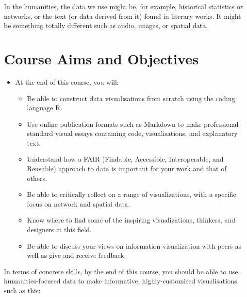 \documentclass[
  letterpaper,
  DIV=11,
  numbers=noendperiod]{scrreprt}
\begin{document}
In the humanities, the data we use might be, for example, historical
statistics or networks, or the text (or data derived from it) found in
literary works. It might be something totally different such as audio,
images, or spatial data.

\section*{Course Aims and Objectives}\label{course-aims-and-objectives}


\begin{itemize}
\item
  At the end of this course, you will:

  \begin{itemize}
  \item
    Be able to construct data visualisations from scratch using the
    coding language R.
  \item
    Use online publication formats such as Markdown to make
    professional-standard visual essays containing code, visualisations,
    and explanatory text.
  \item
    Understand how a FAIR (Findable, Accessible, Interoperable, and
    Reusable) approach to data is important for your work and that of
    others.
  \item
    Be able to critically reflect on a range of visualizations, with a
    specific focus on network and spatial data.
  \item
    Know where to find some of the inspiring visualizations, thinkers,
    and designers in this field.
  \item
    Be able to discuss your views on information visualization with
    peers as well as give and receive feedback.
  \end{itemize}
\end{itemize}

In terms of concrete skills, by the end of this course, you should be
able to use humanities-focused data to make informative,
highly-customised visualisations such as this:
\end{document}

